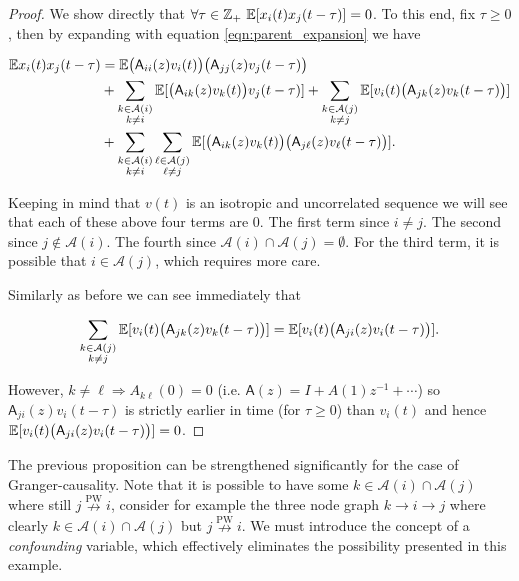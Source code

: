 \documentclass[12pt]{article}
\def\npwgc{\overset{\text{PW}}{\nrightarrow}}  %
\def\A{\mathsf{A}}  %
\newcommand{\anc}[1]{\mathcal{A}(#1)}  %
\begin{document}
\begin{proof}
  We show directly that
  $\forall \tau \in \mathbb{Z}_+\ \mathbb{E}[x_i(t)x_j(t - \tau)] = 0$.  To this end,
  fix $\tau \ge 0$, then by expanding with equation \eqref{eqn:parent_expansion} we have

  \begin{align*}
    \E x_i(t)x_j(t - \tau) &= \E \big(\A_{ii}(z)v_i(t)\big)\big(\A_{jj}(z)v_j(t - \tau)\big)\\
    &+ \sum_{\substack{k \in \anc{i} \\ k \ne i}}\E[\big(\A_{ik}(z)v_k(t)\big)v_j(t - \tau)] + \sum_{\substack{k \in \anc{j} \\ k \ne j}}\E[v_i(t) \big(\A_{jk}(z) v_k(t - \tau)\big)]\\
    &+ \sum_{\substack{k \in \anc{i} \\ k \ne i}}\sum_{\substack{\ell \in \anc{j} \\ \ell \ne j}}\E[\big(\A_{ik}(z)v_k(t)\big)\big(\A_{j\ell}(z)v_\ell(t - \tau)\big)].
  \end{align*}

  
  Keeping in mind that $v(t)$ is an isotropic and uncorrelated
  sequence we will see that each of these above four terms are 0.  The
  first term since $i \ne j$.  The second since $j \not\in \anc{i}$.
  The fourth since $\anc{i} \cap \anc{j} = \emptyset$.  For the third
  term, it is possible that $i \in \anc{j}$, which requires more care.

  Similarly as before we can see immediately that

  \begin{equation*}
    \sum_{\substack{k \in \anc{j} \\ k \ne j}}\E[v_i(t) \big(\A_{jk}(z) v_k(t - \tau)\big)] = \E[v_i(t)\big(\A_{ji}(z)v_i(t - \tau)\big)].
  \end{equation*}

  However, $k \ne \ell \Rightarrow A_{k\ell}(0) = 0$ (i.e.
  $\A(z) = I + A(1)z^{-1} + \cdots$) so $\A_{ji}(z)v_i(t - \tau)$ is
  strictly earlier in time (for $\tau \ge 0$) than $v_i(t)$ and hence
  $\E[v_i(t)\big(\A_{ji}(z)v_i(t - \tau)\big)] = 0$.
\end{proof}

The previous proposition can be strengthened significantly for the
case of Granger-causality.  Note that it is possible to have some
$k \in \anc{i} \cap \anc{j}$ where still $j \npwgc i$, consider for example
the three node graph $k \rightarrow i \rightarrow j$ where
clearly $k \in \anc{i}\cap\anc{j}$ but $j \npwgc i$.  We must
introduce the concept of a \textit{confounding} variable, which
effectively eliminates the possibility presented in this example.
\end{document}
